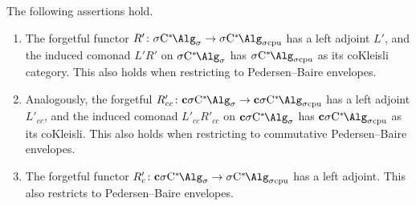 \begin{theorem}\label{thm:comonad}
The following assertions hold.
	\begin{enumerate}
		\item\label{it:SigmaCcpu_coKleisli} The forgetful functor $R'\colon \SigmaC\to \SigmaCcpu$ has a left adjoint $L'$, and the induced comonad $L'R'$ on $\SigmaC$ has $\SigmaCcpu$ as its coKleisli category. This also holds when restricting to Pedersen--Baire envelopes.
		\item\label{it:cSigmaCcpu_coKleisli} Analogously, the forgetful $R'_{cc}\colon \cSigmaC\to \cSigmaCcpu$ has a left adjoint $L'_{cc}$, and the induced comonad $L'_{cc}R'_{cc}$ on $\cSigmaC$ has $\cSigmaCcpu$ as its coKleisli. This also holds when restricting to commutative Pedersen--Baire envelopes.
		\item\label{it:state_space} The forgetful functor $R'_c\colon \cSigmaC \to \SigmaCcpu$ has a left adjoint. This also restricts to Pedersen--Baire envelopes.
	\end{enumerate}
\end{theorem}
